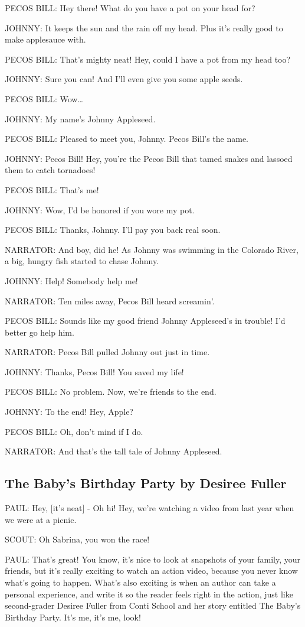 PECOS BILL:
Hey there!
What do you have a pot on your head for?

JOHNNY:
It keeps the sun and the rain off my head.
Plus it's really good to make applesauce with.

PECOS BILL:
That's mighty neat!
Hey, could I have a pot from my head too?

JOHNNY:
Sure you can!
And I'll even give you some apple seeds.

PECOS BILL:
Wow\dots

JOHNNY:
My name's Johnny Appleseed.

PECOS BILL:
Pleased to meet you, Johnny.
Pecos Bill's the name.

JOHNNY:
Pecos Bill!
Hey, you're the Pecos Bill that tamed snakes and lassoed them to catch tornadoes!

PECOS BILL:
That's me!

JOHNNY:
Wow, I'd be honored if you wore my pot.

PECOS BILL:
Thanks, Johnny.
I'll pay you back real soon.

NARRATOR:
And boy, did he!
As Johnny was swimming in the Colorado River, a big, hungry fish started to chase Johnny.

JOHNNY:
Help!
Somebody help me!

NARRATOR:
Ten miles away, Pecos Bill heard screamin'.

PECOS BILL:
Sounds like my good friend Johnny Appleseed's in trouble!
I'd better go help him.

NARRATOR:
Pecos Bill pulled Johnny out just in time.

JOHNNY:
Thanks, Pecos Bill!
You saved my life!

PECOS BILL:
No problem.
Now, we're friends to the end.

JOHNNY:
To the end!
Hey, Apple?

PECOS BILL:
Oh, don't mind if I do.

NARRATOR:
And that's the tall tale of Johnny Appleseed.

\subsection{The Baby's Birthday Party by Desiree Fuller}

PAUL:
Hey, [it's neat] -
Oh hi!
Hey, we're watching a video from last year when we were at a picnic.

SCOUT:
Oh Sabrina, you won the race!

PAUL:
That's great!
You know, it's nice to look at snapshots of your family, your friends, but it's really exciting to watch an action video, because you never know what's going to happen.
What's also exciting is when an author can take a personal experience, and write it so the reader feels right in the action, just like second-grader Desiree Fuller from Conti School and her story entitled The Baby's Birthday Party.
It's me, it's me, look!

